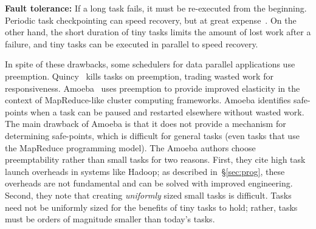 

\vspace{4pt}\noindent\textbf{Fault tolerance:}
If a long task fails, it must be re-executed from the beginning. Periodic task
checkpointing
can speed recovery, but at great expense~\cite{dunlap2002revirt}.
On the other hand, the short duration of
tiny tasks limits the amount of lost work after a failure, and tiny
tasks can be executed in parallel to speed recovery.

In spite of these drawbacks, some schedulers for data parallel applications
use preemption.
Quincy~\cite{isard2009quincy} kills tasks on
preemption, trading wasted work for responsiveness.
Amoeba~\cite{ananthanarayanan2012true} uses preemption to provide improved elasticity in the context of
MapReduce-like cluster computing frameworks.
Amoeba identifies safe-points when a task can be
paused and restarted elsewhere without wasted work. The main drawback of Amoeba
is that it does not provide a mechanism for determining safe-points, which
is difficult for general tasks (even tasks that use the MapReduce programming
model).  The Amoeba authors choose preemptability rather than small tasks for
two reasons. First, they cite high task launch overheads in systems like
Hadoop; as described in~\S\ref{sec:prog}, these overheads are not fundamental
and can be solved with improved engineering. Second, they note that creating
\emph{uniformly} sized small tasks is difficult. Tasks need not be uniformly
sized for the benefits of tiny tasks to hold; rather, tasks must be orders of
magnitude smaller than today's tasks.

